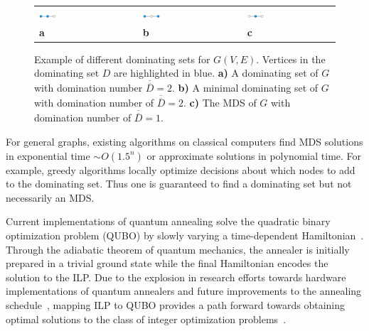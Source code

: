 \documentclass[10pt]{iopart}
\begin{document}
\begin{figure}
	\centering
	\begin{tabular}{p{}p{}p{}p{}p{}}
	\includegraphics[width=0.2\textwidth]{./new_figures/MDS_mds0.pdf}
&&
	\includegraphics[width=0.2\textwidth]{./new_figures/MDS_mds1.pdf}
&&
	\includegraphics[width=0.2\textwidth]{./new_figures/MDS_mds2.pdf}\\
	\centering\textbf{a} && \centering\textbf{b} && \centering\textbf{c}
	\end{tabular}
	\caption{Example of different dominating sets for $G(V, E)$. Vertices in the dominating set $D$ are highlighted in blue. {\textbf{a)}} A dominating set of $G$ with domination number $\overline{\overline{D}} = 2$. {\textbf{b)}} A minimal dominating set of $G$ with domination number of $\overline{\overline{D}} = 2$. {\textbf{c)}} The MDS of $G$ with domination number of $\overline{\overline{D}} = 1$.}
	\label{fig:dominating_sets}
\end{figure}

For general graphs, existing algorithms on classical computers find MDS solutions in exponential time $\sim O( 1.5^n)$ \cite{Fomin2009, vanRooij2009} or approximate solutions in polynomial time. For example, greedy algorithms locally optimize decisions about which nodes to add to the dominating set.
Thus one is guaranteed to find a dominating set but not necessarily an MDS.

Current implementations of quantum annealing solve the quadratic binary optimization problem (QUBO) by slowly varying a time-dependent Hamiltonian~\cite{1998PhRvE..58.5355K, 2000quant.ph..1106F, RevModPhys.80.1061}.
Through the adiabatic theorem of quantum mechanics, the annealer is initially prepared in a trivial ground state while the final Hamiltonian encodes the solution to the ILP.
Due to the explosion in research efforts towards hardware implementations of quantum annealers and future improvements to the annealing schedule~\cite{doi:10.7566/JPSJ.89.044001}, mapping ILP to QUBO provides a path forward towards obtaining optimal solutions to the class of integer optimization problems~\cite{2018Glover}.
\end{document}
